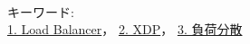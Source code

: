 





~ \\

キーワード:\\
\underline{1. Load Balancer}，
\underline{2. XDP}，
\underline{3. 負荷分散}
\begin{flushright}
\dept \\
\author
\end{flushright}
